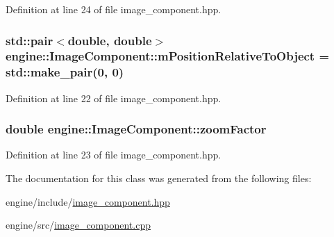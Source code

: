 Definition at line 24 of file image\+\_\+component.\+hpp.

\subsubsection[{\texorpdfstring{m\+Position\+Relative\+To\+Object}{mPositionRelativeToObject}}]{\setlength{\rightskip}{0pt plus 5cm}std\+::pair$<$double, double$>$ engine\+::\+Image\+Component\+::m\+Position\+Relative\+To\+Object = std\+::make\+\_\+pair(0, 0)\hspace{0.3cm}{\ttfamily [protected]}}\hypertarget{classengine_1_1_image_component_aa89d785f15ac45a3b4343d08a2c5c146}{}\label{classengine_1_1_image_component_aa89d785f15ac45a3b4343d08a2c5c146}


Definition at line 22 of file image\+\_\+component.\+hpp.

\subsubsection[{\texorpdfstring{zoom\+Factor}{zoomFactor}}]{\setlength{\rightskip}{0pt plus 5cm}double engine\+::\+Image\+Component\+::zoom\+Factor\hspace{0.3cm}{\ttfamily [protected]}}\hypertarget{classengine_1_1_image_component_aa27852286227a84dc9c9f01c9fe2add8}{}\label{classengine_1_1_image_component_aa27852286227a84dc9c9f01c9fe2add8}


Definition at line 23 of file image\+\_\+component.\+hpp.



The documentation for this class was generated from the following files\+:\begin{DoxyCompactItemize}
\item 
engine/include/\hyperlink{image__component_8hpp}{image\+\_\+component.\+hpp}\item 
engine/src/\hyperlink{image__component_8cpp}{image\+\_\+component.\+cpp}\end{DoxyCompactItemize}
